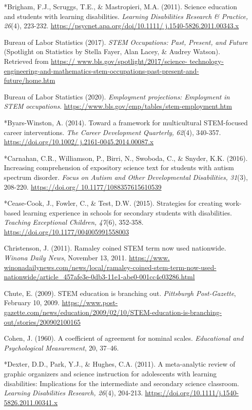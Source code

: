 \documentclass[11pt]{sig-alternate}
\begin{document}
\begin{large}
*Brigham, F.J., Scruggs, T.E., \& Mastropieri, M.A. (2011). Science education and students with learning disabilities. \textit{Learning Disabilities Research \& Practice, 26}(4), 223-232. \url{https://psycnet.apa.org/doi/10.1111/ j.1540-5826.2011.00343.x}

Bureau of Labor Statistics (2017). \textit{STEM Occupations: Past, Present, and Future} (Spotlight on Statistics by Stella Fayer, Alan Lacey, \& Audrey Watson). Retrieved from \url{https:// www.bls.gov/spotlight/2017/science- technology-engineering-and-mathematics-stem-occupations-past-present-and-future/home.htm}

Bureau of Labor Statistics (2020).\textit{ Employment projections: Employment in STEM occupations.} \url{https://www.bls.gov/emp/tables/stem-employment.htm}

*Byars-Winston, A. (2014). Toward a framework for multicultural STEM-focused career 
interventions. \textit{The Career Development Quarterly, 62}(4), 340-357. \url{https://doi.org/10.1002/ j.2161-0045.2014.00087.x}

*Carnahan, C.R., Williamson, P., Birri, N., Swoboda, C., \& Snyder, K.K. (2016). Increasing comprehension of expository science text for students with autism spectrum disorder. \textit{Focus on Autism and Other Developmental Disabilities, 31}(3), 208-220. \url{https://doi.org/ 10.1177/1088357615610539}

*Cease-Cook, J., Fowler, C., \& Test, D.W. (2015). Strategies for creating work-based learning experience in schools for secondary students with disabilities.\textit{ Teaching Exceptional Children, 47}(6), 352-358. \url{https://doi.org/10.1177/004005991558003}

Christenson, J. (2011). Ramaley coined STEM term now used nationwide. \textit{Winona Daily News}, 
November 13, 2011. \url{https://www. winonadailynews.com/news/local/ramaley-coined-stem-term-now-used-nationwide/article_457afe3e-0db3-11e1-abe0-001cc4c03286.html}

Chute, E. (2009). STEM education is branching out. \textit{Pittsburgh Post-Gazette}, February 10, 2009. \url{https://www.post-gazette.com/news/education/2009/02/10/STEM-education-is-branching-out/stories/200902100165}

Cohen, J. (1960). A coefficient of agreement for nominal scales. \textit{Educational and Psychological Measurement}, 20, 37–46.

*Dexter, D.D., Park, Y.J., \& Hughes, C.A. (2011). A meta-analytic review of graphic organizers and science instruction for adolescents with learning disabilities: Implications for the intermediate and secondary science classroom.\textit{ Learning Disabilities Research, 26}(4), 204-213. \url{https://doi.org/10.1111/j.1540-5826.2011.00341.x}


\end{large}
\end{document}
